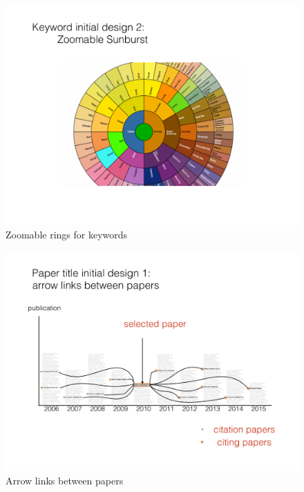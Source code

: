 \begin{figure}[htb!]
    \centering
    \includegraphics[width=160mm]{visproposalDrawing_page_Part_10.pdf}
    \caption{Zoomable rings for keywords}
    \label{fig:zoomable_ring}
\end{figure}

\begin{figure}[htb!]
    \centering
    \includegraphics[width=160mm]{visproposalDrawing_page_Part_11.pdf}
    \caption{Arrow links between papers}
    \label{fig:zoomable_arrow}
\end{figure}
